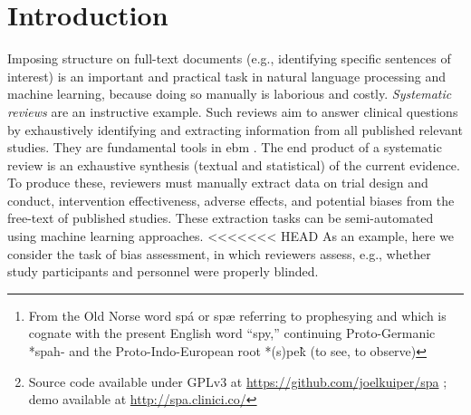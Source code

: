 \documentclass[runningheads,a4paper]{llncs}
\begin{document}
\begin{abstract}
Summarizing the evidence about medical interventions is an immense undertaking, in part because unstructured \ac{pdf} documents remain the main vehicle for disseminating the results of clinical trials.
Clinicians and researchers must therefore manually extract and synthesise information from these \acp{pdf}s to be published in \emph{systematic reviews}.
We introduce Spá,\footnote{From the Old Norse word spá or spæ referring to prophesying and which is cognate with the present English word “spy,” continuing Proto-Germanic *spah- and the Proto-Indo-European root *(s)pe\`{k} (to see, to observe)}\footnote{Source code available under GPLv3 at \url{https://github.com/joelkuiper/spa} \cite{kuiper2014}; demo available at \url{http://spa.clinici.co/}} a web-based viewer that enables automated annotation and summarisation of \ac{pdf}s via \ac{ml}.
To illustrate its functionalility, here we use Spá to semi-automate the assessment of bias in clinical trials.
Spá can visualize the output from hybrid models that simultaneously classify documents (e.g., identifying trials as low or high risk of various biases), and annotate sentences that support these classifications.
Spá has a modular architecture and new models may be trivially added, therefore the tool may be widely useful in other domains with a \ac{pdf}-based literature, including law, physics, and biology.

\end{abstract}

\acresetall
{}

\section{Introduction}
\label{section:intro}

Imposing structure on full-text documents (e.g., identifying specific sentences of interest) is an important and practical task in natural language processing and machine learning, because doing so manually is laborious and costly.
\emph{Systematic reviews} are an instructive example.
Such reviews aim to answer clinical questions by exhaustively identifying and extracting information from all published relevant studies.
They are fundamental tools in \ac{ebm} \cite{sackett1996}.
The end product of a systematic review is an exhaustive synthesis (textual and statistical) of the current evidence.
To produce these, reviewers must manually extract data on trial design and conduct, intervention effectiveness, adverse effects, and potential biases from the free-text of published studies.
These extraction tasks can be semi-automated using machine learning approaches.
<<<<<<< HEAD
As an example, here we consider the task of bias assessment, in which reviewers assess, e.g., whether study participants and personnel were properly blinded.
\end{document}
